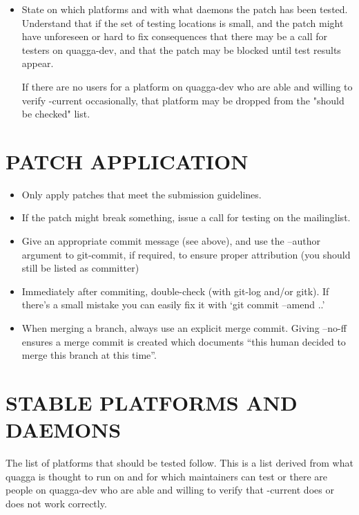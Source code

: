 \documentclass[oneside]{article}
\begin{document}
\begin{itemize}
\item State on which platforms and with what daemons the patch has been
      tested.  Understand that if the set of testing locations is small,
      and the patch might have unforeseen or hard to fix consequences that
      there may be a call for testers on quagga-dev, and that the patch
      may be blocked until test results appear.

      If there are no users for a platform on quagga-dev who are able and
      willing to verify -current occasionally, that platform may be
      dropped from the "should be checked" list.

\end{itemize}

\section{PATCH APPLICATION}

\begin{itemize}

\item Only apply patches that meet the submission guidelines.

\item If the patch might break something, issue a call for testing on the
      mailinglist.

\item Give an appropriate commit message (see above), and use the --author
      argument to git-commit, if required, to ensure proper attribution (you
      should still be listed as committer)

\item Immediately after commiting, double-check (with git-log and/or gitk).
      If there's a small mistake you can easily fix it with `git commit
      --amend ..'

\item When merging a branch, always use an explicit merge commit. Giving
      --no-ff ensures a merge commit is created which documents ``this human
      decided to merge this branch at this time''.
\end{itemize}

\section{STABLE PLATFORMS AND DAEMONS}

The list of platforms that should be tested follow.  This is a list
derived from what quagga is thought to run on and for which
maintainers can test or there are people on quagga-dev who are able
and willing to verify that -current does or does not work correctly.
\end{document}
